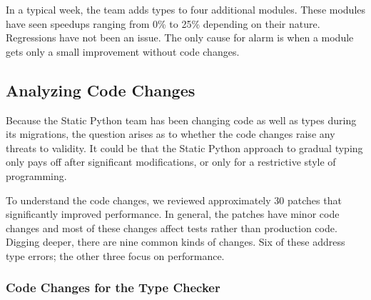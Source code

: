 \documentclass[english,cleveref,submission]{programming}
\newcommand{\SP}{Static Python}
\begin{document}
In a typical week, the team adds types to four additional modules.
These modules have seen speedups ranging from 0\% to 25\% depending
on their nature.
Regressions have not been an issue.
The only cause for alarm is when a module gets only a small improvement
without code changes.


\subsection{Analyzing Code Changes}

Because the \SP{} team has been changing code as well as types
during its migrations, the question arises as to whether the code changes
raise any threats to validity.
It could be that the \SP{} approach to gradual typing only pays off
after significant modifications, or only for a restrictive style of programming.

To understand the code changes, we reviewed approximately 30 patches that
significantly improved performance.
In general, the patches have minor code changes and most of these changes
affect tests rather than production code.
Digging deeper, there are nine common kinds of changes.
Six of these address type errors; the other three focus on performance.


\subsubsection{Code Changes for the Type Checker}

\end{document}
